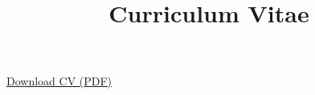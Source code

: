 \documentclass[
  letterpaper,
  DIV=11,
  numbers=noendperiod]{scrartcl}
\title{Curriculum Vitae}
\author{}
\date{}
\begin{document}
\maketitle


\href{cv/Tanvir_cv.pdf}{Download CV (PDF)}
\end{document}
